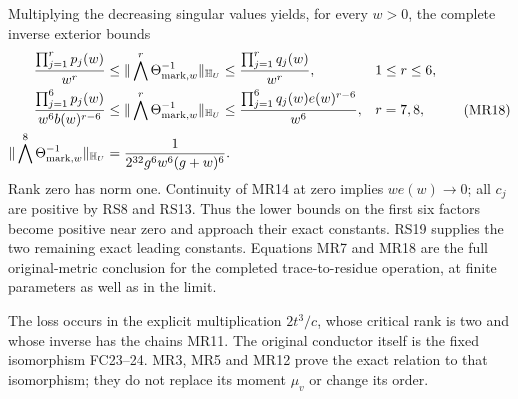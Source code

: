 \documentclass[11pt]{article}
\begin{document}
Multiplying the decreasing singular values yields, for every
$w>0$, the complete inverse exterior bounds
\begin{equation}
 \begin{aligned}
 \frac{\prod_{j=1}^r p_j(w)}{w^r}
 &\le\|\bigwedge^r\Theta_{{\rm mark},w}^{-1}\|_{\mathbb H_U}
 \le\frac{\prod_{j=1}^r q_j(w)}{w^r},&&1\le r\le6,\\
 \frac{\prod_{j=1}^6p_j(w)}{w^6b(w)^{r-6}}
 &\le\|\bigwedge^r\Theta_{{\rm mark},w}^{-1}\|_{\mathbb H_U}
 \le\frac{\prod_{j=1}^6q_j(w)e(w)^{r-6}}{w^6},&&r=7,8,\\
 \|\bigwedge^8\Theta_{{\rm mark},w}^{-1}\|_{\mathbb H_U}
 &=\frac1{2^{32}g^6w^6(g+w)^6}.
 \end{aligned}\tag{MR18}
\end{equation}
Rank zero has norm one. Continuity of MR14 at zero implies
$we(w)\to0$; all $c_j$ are positive by RS8 and RS13.
Thus the lower bounds on the first six factors become positive
near zero and approach their exact constants. RS19 supplies
the two remaining exact leading constants. Equations MR7 and
MR18 are the full original-metric conclusion for the completed
trace-to-residue operation, at finite parameters as well as in
the limit.

The loss occurs in the explicit multiplication $2t^3/c$, whose
critical rank is two and whose inverse has the chains MR11.
The original conductor itself is the fixed isomorphism FC23--24.
MR3, MR5 and MR12 prove the exact relation to that isomorphism;
they do not replace its moment $\mu_v$ or change its order.
\end{document}
